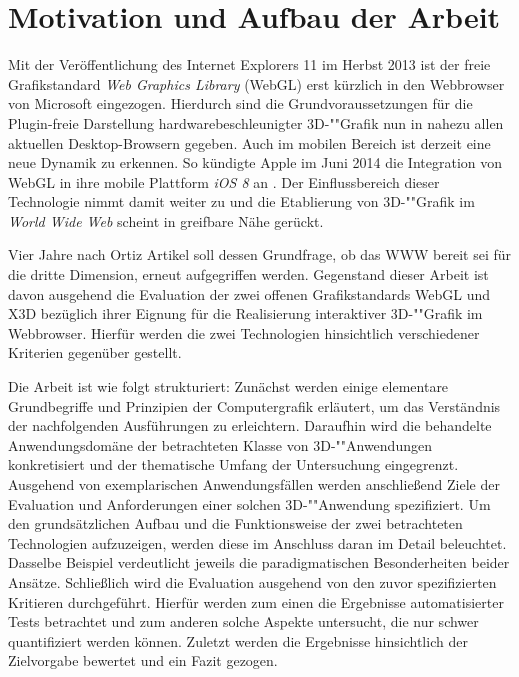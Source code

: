 \chapter{Motivation und Aufbau der Arbeit}
\label{CHAP:MOTIVATION}

Mit der Veröffentlichung des Internet Explorers 11 im Herbst 2013 \autocite{MS_RELEASE_IE11} ist der freie Grafikstandard \emph{Web Graphics Library} (WebGL) erst kürzlich in den Webbrowser von Microsoft eingezogen. Hierdurch sind die Grundvoraussetzungen für die Plugin-freie Darstellung hardwarebeschleunigter 3D-""Grafik nun in nahezu allen aktuellen Desktop-Browsern gegeben.
Auch im mobilen Bereich ist derzeit eine neue Dynamik zu erkennen. So kündigte Apple im Juni 2014 die Integration von WebGL in ihre mobile Plattform \emph{iOS 8} an \autocite{APPLE_WWDC_2014_WEBGL}. Der Einflussbereich dieser Technologie nimmt damit weiter zu und die Etablierung von 3D-""Grafik im \emph{World Wide Web} scheint in greifbare Nähe gerückt.

Vier Jahre nach Ortiz Artikel soll dessen Grundfrage, ob das WWW bereit sei für die dritte Dimension, erneut aufgegriffen werden. Gegenstand dieser Arbeit ist davon ausgehend die Evaluation der zwei offenen Grafikstandards  WebGL und X3D bezüglich ihrer Eignung für die Realisierung interaktiver 3D-""Grafik im Webbrowser. Hierfür werden die zwei Technologien hinsichtlich verschiedener Kriterien gegenüber gestellt.

Die Arbeit ist wie folgt strukturiert: Zunächst werden einige elementare Grundbegriffe und Prinzipien der Computergrafik erläutert, um das Verständnis der nachfolgenden Ausführungen zu erleichtern. Daraufhin wird die behandelte Anwendungsdomäne der betrachteten Klasse von 3D-""Anwendungen konkretisiert und der thematische Umfang der Untersuchung eingegrenzt. Ausgehend von exemplarischen Anwendungsfällen werden anschließend Ziele der Evaluation und Anforderungen einer solchen 3D-""Anwendung spezifiziert. Um den grundsätzlichen Aufbau und die Funktionsweise der zwei betrachteten Technologien aufzuzeigen, werden diese im Anschluss daran im Detail beleuchtet. Dasselbe Beispiel verdeutlicht jeweils die paradigmatischen Besonderheiten beider Ansätze. Schließlich wird die Evaluation ausgehend von den zuvor spezifizierten Kritieren durchgeführt. Hierfür werden zum einen die Ergebnisse automatisierter Tests betrachtet und zum anderen solche Aspekte untersucht, die nur schwer quantifiziert werden können. Zuletzt werden die Ergebnisse hinsichtlich der Zielvorgabe bewertet und ein Fazit gezogen.

